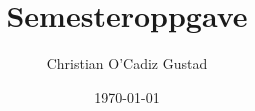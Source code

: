 \documentclass[11pt]{article}
\author{Christian O'Cadiz Gustad}
\date{\today}
\title{Semesteroppgave}
\begin{document}
\maketitle


\label{sec-1}


\newpage
\end{document}
